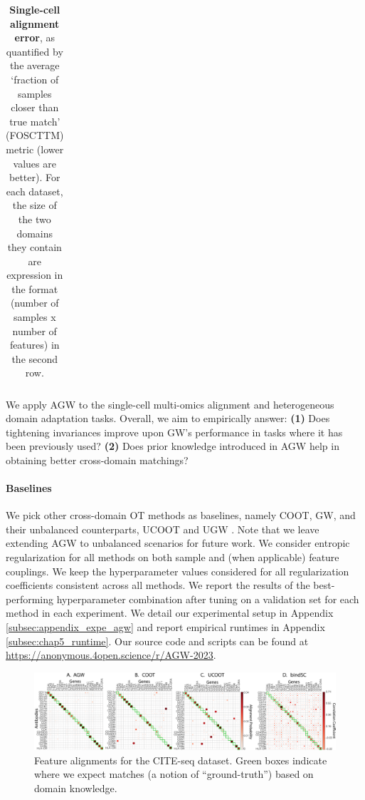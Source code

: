 \begin{table}[t]
\begin{center}
{\begin{tabular}{lccccccc}
\end{tabular}}
\end{center}
\caption{\label{table:scCells} \textbf{Single-cell alignment error},
as quantified by the average `fraction of samples closer than true match'
(FOSCTTM) metric (lower values are better).
For each dataset, the size of the two domains they contain are expression in the format
(number of samples x number of features) in the second row.
}
\end{table}

We apply AGW to the single-cell multi-omics alignment and heterogeneous domain adaptation tasks.
Overall, we aim to empirically answer:
\textbf{(1)} Does tightening invariances improve upon GW's performance in tasks where
it has been previously used? \textbf{(2)} Does prior knowledge introduced in AGW help
in obtaining better cross-domain matchings?

\paragraph{Baselines} We pick other cross-domain OT methods as baselines, namely COOT, GW,
and their unbalanced counterparts, UCOOT \citep{Tran23} and UGW \citep{Sejourne20}.
Note that we leave extending AGW to unbalanced scenarios for future work.
We consider entropic regularization for all methods on both sample and
(when applicable) feature couplings. We keep the hyperparameter values considered
for all regularization coefficients consistent across all methods. We report the results of
the best-performing hyperparameter combination after tuning on a validation set for each method
in each experiment. We detail our experimental setup in Appendix \ref{subsec:appendix_expe_agw} and
report empirical runtimes in Appendix \ref{subsec:chap5_runtime}.
Our source code and scripts can be found at \url{https://anonymous.4open.science/r/AGW-2023}.

\begin{figure}[t]
\centering
\includegraphics[width=\linewidth]{./Chapitre5/fig/cite_fgcoot_final.pdf}
\caption{\label{fig:cite} Feature alignments for the CITE-seq dataset. Green boxes indicate
where we expect matches (a notion of ``ground-truth'') based on domain knowledge.}
\end{figure}

